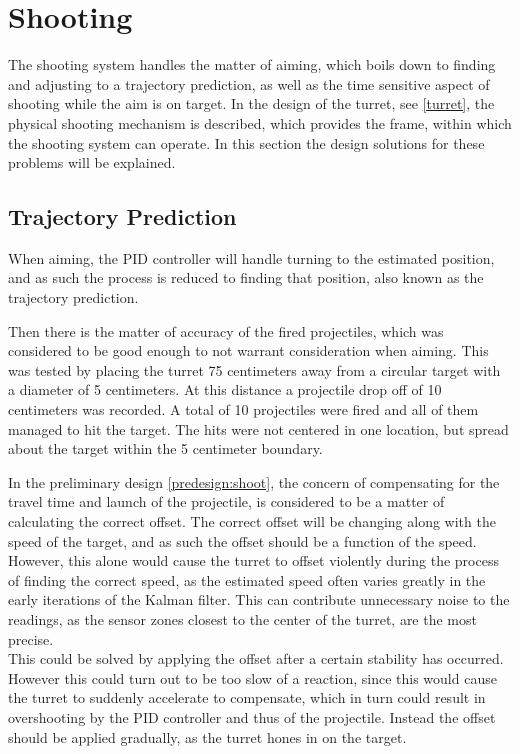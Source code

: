 \section{Shooting}
The shooting system handles the matter of aiming, which boils down to finding and adjusting to a trajectory prediction, as well as the time sensitive aspect of shooting while the aim is on target. In the design of the turret, see \cref{turret}, the physical shooting mechanism is described, which provides the frame, within which the shooting system can operate. In this section the design solutions for these problems will be explained.

\subsection{Trajectory Prediction}
When aiming, the PID controller will handle turning to the estimated position, and as such the process is reduced to finding that position, also known as the trajectory prediction.

Then there is the matter of accuracy of the fired projectiles, which was considered to be good enough to not warrant consideration when aiming. This was tested by placing the turret 75 centimeters away from a circular target with a diameter of 5 centimeters. At this distance a projectile drop off of 10 centimeters was recorded. A total of 10 projectiles were fired and all of them managed to hit the target. The hits were not centered in one location, but spread about the target within the 5 centimeter boundary.

In the preliminary design \cref{predesign:shoot}, the concern of compensating for the travel time and launch of the projectile, is considered to be a matter of calculating the correct offset. The correct offset will be changing along with the speed of the target, and as such the offset should be a function of the speed. However, this alone would cause the turret to offset violently during the process of finding the correct speed, as the estimated speed often varies greatly in the early iterations of the Kalman filter. This can contribute unnecessary noise to the readings, as the sensor zones closest to the center of the turret, are the most precise. \\

This could be solved by applying the offset after a certain stability has occurred. However this could turn out to be too slow of a reaction, since this would cause the turret to suddenly accelerate to compensate, which in turn could result in overshooting by the PID controller and thus of the projectile. Instead the offset should be applied gradually, as the turret hones in on the target. \\

